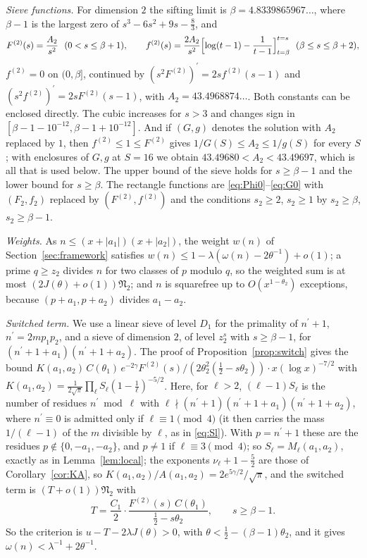 \documentclass[11pt,a4paper]{amsart}
\theoremstyle{remark}
\numberwithin{equation}{section}
\newcommand{\cN}{\mathfrak N}
\begin{document}
\emph{Sieve functions.} For dimension $2$ the sifting limit is $\beta=4.8339865967\ldots$, where $\beta-1$ is the
largest zero of $s^3-6s^2+9s-\frac83$, and \cite[Chapter~11]{FI}
\[
F^{(2)}(s)=\frac{A_2}{s^2}\ \ (0<s\le\beta+1),\qquad
f^{(2)}(s)=\frac{2A_2}{s^2}\Bigl[\log(t-1)-\frac1{t-1}\Bigr]_{t=\beta}^{t=s}\ \ (\beta\le s\le\beta+2),
\]
$f^{(2)}=0$ on $(0,\beta]$, continued by $(s^2F^{(2)})^\prime=2sf^{(2)}(s-1)$ and $(s^2f^{(2)})^\prime=2sF^{(2)}(s-1)$,
with $A_2=43.4968874\ldots$. Both constants can be enclosed directly. The cubic increases for $s>3$ and changes
sign in $[\beta-1-10^{-12},\beta-1+10^{-12}]$. And if $(G,g)$ denotes the solution with $A_2$ replaced by $1$, then
$f^{(2)}\le1\le F^{(2)}$ gives $1/G(S)\le A_2\le1/g(S)$ for every $S$; with enclosures of $G,g$ at $S=16$ we obtain
$43.49680<A_2<43.49697$, which is all that is used below. The upper bound of the sieve holds for $s\ge\beta-1$ and the lower bound for $s\ge\beta$. The
rectangle functions are \eqref{eq:Phi0}--\eqref{eq:G0} with $(F_2,f_2)$ replaced by $(F^{(2)},f^{(2)})$ and the
conditions $s_2\ge2$, $s_2\ge1$ by $s_2\ge\beta$, $s_2\ge\beta-1$.

\emph{Weights.} As $n\le(x+|a_1|)(x+|a_2|)$, the weight $w(n)$ of Section~\ref{sec:framework} satisfies
$w(n)\le1-\lambda(\omega(n)-2\theta^{-1})+o(1)$; a prime $q\ge z_2$ divides $n$ for two classes of $p$ modulo $q$,
so the weighted sum is at most $(2J(\theta)+o(1))\cN_2$; and $n$ is squarefree up to $O(x^{1-\theta_2})$
exceptions, because $(p+a_1,p+a_2)$ divides $a_1-a_2$.

\emph{Switched term.} We use a linear sieve of level $D_1$ for the primality of $n^\prime+1$, $n^\prime=2mp_1p_2$, and a
sieve of dimension $2$, of level $z_2^s$ with $s\ge\beta-1$, for $(n^\prime+1+a_1)(n^\prime+1+a_2)$. The proof of
Proposition~\ref{prop:switch} gives the bound
$K(a_1,a_2)\,C(\theta_1)\,e^{-2\gamma}F^{(2)}(s)/(2\theta_2^2(\frac12-s\theta_2))\cdot x(\log x)^{-7/2}$ with
$K(a_1,a_2)=\frac1{2\sqrt\pi}\prod_\ell S_\ell(1-\frac1\ell)^{-5/2}$. Here, for $\ell>2$, $(\ell-1)S_\ell$ is the
number of residues $n^\prime\bmod\ell$ with $\ell\nmid(n^\prime+1)(n^\prime+1+a_1)(n^\prime+1+a_2)$, where $n^\prime\equiv0$ is
admitted only if $\ell\equiv1\pmod 4$ (it then carries the mass $1/(\ell-1)$ of the $m$ divisible by $\ell$, as in
\eqref{eq:Sl}). With $p=n^\prime+1$ these are the residues $p\notin\{0,-a_1,-a_2\}$, and $p\ne1$ if
$\ell\equiv3\pmod 4$; so $S_\ell=M_\ell(a_1,a_2)$, exactly as in Lemma~\ref{lem:local}; the exponents $\nu_\ell+1-\frac52$ are those of Corollary~\ref{cor:KA}, so
$K(a_1,a_2)/A(a_1,a_2)=2e^{5\gamma/2}/\sqrt\pi$, and the switched term is $(T+o(1))\cN_2$ with
\[
T=\frac{C_1}2\cdot\frac{F^{(2)}(s)\,C(\theta_1)}{\frac12-s\theta_2},\qquad s\ge\beta-1 .
\]
So the criterion is $u-T-2\lambda J(\theta)>0$, with $\theta<\frac12-(\beta-1)\theta_2$, and it gives
$\omega(n)<\lambda^{-1}+2\theta^{-1}$.
\end{document}

